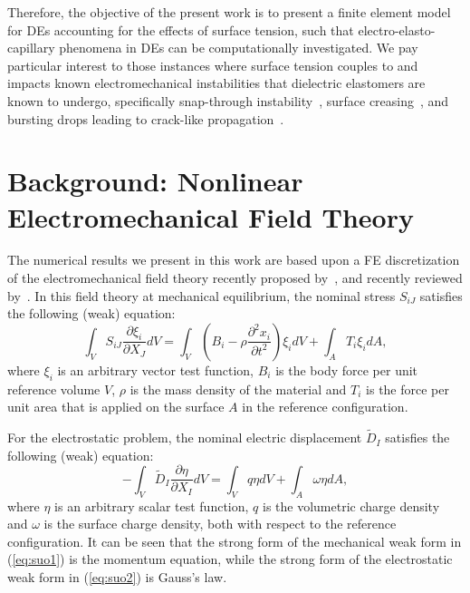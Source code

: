 \documentclass[final,authoryear,3p,times]{elsarticle}
\begin{document}
Therefore, the objective of the present work is to present a finite element model for DEs accounting for the effects of surface tension, such that electro-elasto-capillary phenomena in DEs can be computationally investigated.  We pay particular interest to those instances where surface tension couples to and impacts known electromechanical instabilities that dielectric elastomers are known to undergo, specifically snap-through instability~\citep{pelrineSCIENCE2000}, surface creasing~\citep{wangPRL2011,wangAM2012}, and bursting drops leading to crack-like propagation~\citep{wangNC2012}.

\section{Background: Nonlinear Electromechanical Field Theory}

The numerical results we present in this work are based upon a FE discretization of the electromechanical field theory recently proposed by~\citet{suoJMPS2008}, and recently reviewed by~\citet{suoAMSS2010}.   In this field theory at mechanical equilibrium, the nominal stress $S_{iJ}$ satisfies the following (weak) equation:
\begin{equation}\label{eq:suo1} \int_{V}S_{iJ}\frac{\partial\xi_{i}}{\partial X_{J}}dV=\int_{V}\left(B_{i}-\rho\frac{\partial^{2}x_{i}}{\partial t^{2}}\right)\xi_{i}dV+\int_{A}T_{i}\xi_{i}dA,
\end{equation}
where $\xi_{i}$ is an arbitrary vector test function, $B_{i}$ is the body force per unit reference volume $V$, $\rho$ is the mass density of the material and $T_{i}$ is the force per unit area that is applied on the surface $A$ in the reference configuration.  

For the electrostatic problem, the nominal electric displacement $\tilde{D}_{I}$ satisfies the following (weak) equation:
\begin{equation}\label{eq:suo2} -\int_{V}\tilde{D}_{I}\frac{\partial\eta}{\partial X_{I}}dV=\int_{V}q\eta dV+\int_{A}\omega\eta dA,
\end{equation}
where $\eta$ is an arbitrary scalar test function, $q$ is the volumetric charge density and $\omega$ is the surface charge density, both with respect to the reference configuration.  It can be seen that the strong form of the mechanical weak form in (\ref{eq:suo1}) is the momentum equation, while the strong form of the electrostatic weak form in (\ref{eq:suo2}) is Gauss's law.  
\end{document}
